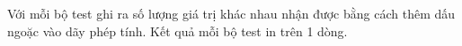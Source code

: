 Với mỗi bộ test ghi ra số lượng giá trị khác nhau nhận được bằng cách thêm dấu ngoặc vào dãy phép tính. Kết quả mỗi bộ test in trên 1 dòng.